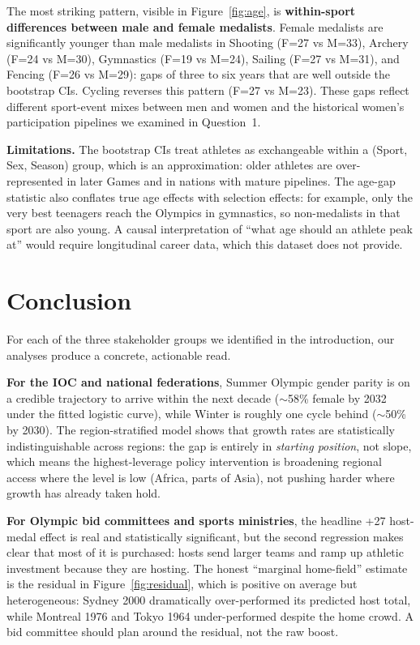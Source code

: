 \documentclass[11pt]{article}
\begin{document}
The most striking pattern, visible in Figure~\ref{fig:age}, is \textbf{within-sport differences between male and female medalists}. Female medalists are significantly younger than male medalists in Shooting (F=27 vs M=33), Archery (F=24 vs M=30), Gymnastics (F=19 vs M=24), Sailing (F=27 vs M=31), and Fencing (F=26 vs M=29): gaps of three to six years that are well outside the bootstrap CIs. Cycling reverses this pattern (F=27 vs M=23). These gaps reflect different sport-event mixes between men and women and the historical women's participation pipelines we examined in Question~1.

\textbf{Limitations.} The bootstrap CIs treat athletes as exchangeable within a (Sport, Sex, Season) group, which is an approximation: older athletes are over-represented in later Games and in nations with mature pipelines. The age-gap statistic also conflates true age effects with selection effects: for example, only the very best teenagers reach the Olympics in gymnastics, so non-medalists in that sport are also young. A causal interpretation of ``what age should an athlete peak at'' would require longitudinal career data, which this dataset does not provide.

\section*{Conclusion}

For each of the three stakeholder groups we identified in the introduction, our analyses produce a concrete, actionable read.

\textbf{For the IOC and national federations}, Summer Olympic gender parity is on a credible trajectory to arrive within the next decade ($\sim$58\% female by 2032 under the fitted logistic curve), while Winter is roughly one cycle behind ($\sim$50\% by 2030). The region-stratified model shows that growth rates are statistically indistinguishable across regions: the gap is entirely in \textit{starting position}, not slope, which means the highest-leverage policy intervention is broadening regional access where the level is low (Africa, parts of Asia), not pushing harder where growth has already taken hold.

\textbf{For Olympic bid committees and sports ministries}, the headline +27 host-medal effect is real and statistically significant, but the second regression makes clear that most of it is purchased: hosts send larger teams and ramp up athletic investment because they are hosting. The honest ``marginal home-field'' estimate is the residual in Figure~\ref{fig:residual}, which is positive on average but heterogeneous: Sydney 2000 dramatically over-performed its predicted host total, while Montreal 1976 and Tokyo 1964 under-performed despite the home crowd. A bid committee should plan around the residual, not the raw boost.
\end{document}
